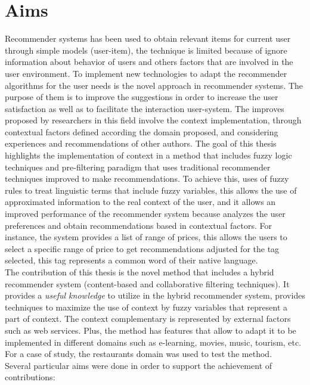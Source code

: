\section{Aims}

Recommender systems has been used to obtain relevant items for current user
through simple models (user-item), the technique is limited 
because of ignore information about behavior of users and others
factors that are involved in the user environment. 
To implement new technologies to adapt
the recommender algorithms for the user needs is the novel approach in
recommender systems. 
The purpose of them is to improve the suggestions in order to increase the user
satisfaction as well as to facilitate the interaction user-system.
The improves proposed by researchers in this field involve the context
implementation, through contextual factors defined according the domain 
proposed, and considering 
experiences and recommendations of other authors.
The goal of this thesis highlights the implementation of context in 
a method that includes fuzzy logic
techniques and pre-filtering paradigm that uses traditional recommender
techniques improved to make recommendations. To achieve this, 
uses of fuzzy rules to treat linguistic terms that include fuzzy variables, 
this allows the use of approximated information 
to the real context of the user, and it allows an improved
performance of the recommender system because analyzes the user 
preferences and obtain recommendations
based in contextual factors. 
For instance, the system provides a list of
range of prices, this allows the users to select a specific range of
price to get recommendations adjusted for the tag selected, this tag represents
a common word of their native language.\\
The contribution of this thesis is the novel method that 
includes a hybrid recommender
system (content-based and collaborative filtering techniques). It
provides a \textit{useful knowledge} 
to utilize in the hybrid recommender system, provides techniques to 
maximize the use of context by fuzzy variables that represent a part
of context. The context complementary is represented by external factors
such as web services. 
Plus, the method has features that allow to adapt it to be
implemented in different domains such as e-learning, movies,
music, tourism, etc. For a case of study, the restaurants domain
was used to test the method.\\
Several particular aims were done in order to support the achievement 
of contributions:
